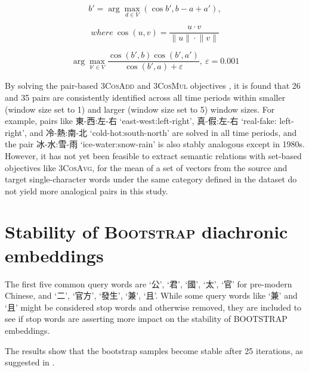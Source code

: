 \begin{equation}
  b' = \arg\max_{d \in V}(\cos b', b - a + a'){,}
\end{equation}

\begin{equation*}
  where\: \cos(u,v) = \frac{u \cdot v}{\lVert{u}\rVert \cdot \lVert{v}\rVert}
\end{equation*}

\begin{equation}
  \arg\max_{b' \in V}\frac{\cos(b',b) \cos(b',a')}{\cos(b',a) + \varepsilon}{,}\: \varepsilon = 0.001
\end{equation}

By solving the pair-based \textsc{3CosAdd} and \textsc{3CosMul} objectives \parencite{levy2014linguistic}, it is found that 26 and 35 pairs are consistently identified across all time periods within smaller (window size set to 1) and larger (window size set to 5) window sizes. For example, pairs like 東-西:左-右 `east-west:left-right', 真-假:左-右 `real-fake: left-right', and 冷-熱:南-北 `cold-hot:south-north' are solved in all time periods, and the pair 冰-水:雪-雨 `ice-water:snow-rain' is also stably analogous except in 1980s. However, it has not yet been feasible to extract semantic relations with set-based objectives like \textsc{3CosAvg}, for the mean of a set of vectors from the source and target single-character words under the same category defined in the dataset do not yield more analogical pairs in this study. %

\section{Stability of \textsc{Bootstrap} diachronic embeddings}

The first five common query words are `公', `君', `國', `太', `官' for pre-modern Chinese, and `二', `官方', `發生', `兼', `且'. While some query words like `兼' and `且' might be considered stop words and otherwise removed, they are included to see if stop words are asserting more impact on the stability of \textsc{BOOTSTRAP} embeddings.

The results show that the bootstrap samples become stable after 25 iterations, as suggested in \textcite{antoniak2018evaluating}. 

